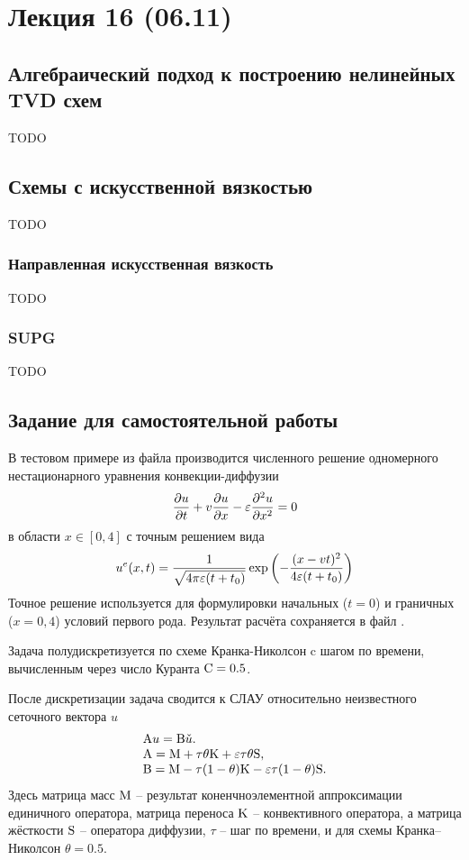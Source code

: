 \section{Лекция 16 (06.11)}

\subsection{Алгебраический подход к построению нелинейных TVD схем}
TODO

\subsection{Схемы с искусственной вязкостью}
TODO
\subsubsection{Направленная искусственная вязкость}
TODO
\subsubsection{SUPG}
TODO


\subsection{Задание для самостоятельной работы}
\label{sec:hw_supg}
В тестовом примере  из файла 
производится численного решение одномерного нестационарного уравнения конвекции-диффузии
$$
\frac{\partial u}{\partial t} + v \frac{\partial u}{\partial x} - \varepsilon \frac{\partial^2 u}{\partial x^2} = 0
$$
в области $x\in[0, 4]$
с точным решением вида
$$
u^e(x, t) = \frac{1}{\sqrt{4\pi \varepsilon (t + t_0)}} \exp\left(-\frac{(x - v t)^2}{4\varepsilon(t+t_0)}\right)
$$
Точное решение используется для формулировки начальных ($t=0$) и граничных ($x=0,4$) условий первого рода.
Результат расчёта сохраняется в файл .

Задача полудискретизуется по схеме Кранка-Николсон c шагом по времени, вычисленным через число Куранта $\rm C = 0.5$.

После дискретизации задача сводится к СЛАУ относительно неизвестного сеточного вектора $u$
$$
\begin{array}{ll}
{\rm A} u = {\rm B} \check u. \\
{\rm A} = {\rm M} + \tau\theta {\rm K} + \varepsilon\tau\theta {\rm S}, \\
{\rm B} = {\rm M} - \tau(1-\theta){\rm K} - \varepsilon\tau(1-\theta) {\rm S}.
\end{array}
$$
Здесь матрица масс ${\rm M}$ -- результат коненчноэлементной аппроксимации единичного оператора,
матрица переноса ${\rm K}$ -- конвективного оператора,
а матрица жёсткости ${\rm S}$ -- оператора диффузии,
$\tau$ -- шаг по времени, и для схемы Кранка--Николсон $\theta=0.5$.


